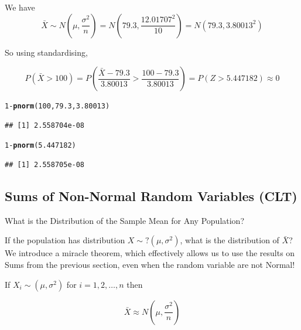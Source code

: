 \documentclass[t,xcolor=pdftex,dvipsnames,table]{beamer}\usepackage[]{graphicx}\usepackage[]{color}
\makeatletter
\newcommand{\hlnum}[1]{\textcolor[rgb]{0.686,0.059,0.569}{#1}}%
\newcommand{\hlopt}[1]{\textcolor[rgb]{0,0,0}{#1}}%
\newcommand{\hlstd}[1]{\textcolor[rgb]{0.345,0.345,0.345}{#1}}%
\newcommand{\hlkwd}[1]{\textcolor[rgb]{0.737,0.353,0.396}{\textbf{#1}}}%
\newenvironment{kframe}{%
 \def\at@end@of@kframe{}%
 \ifinner\ifhmode%
  \def\at@end@of@kframe{\end{minipage}}%
  \begin{minipage}{\columnwidth}%
 \fi\fi%
 \def\FrameCommand##1{\hskip\@totalleftmargin \hskip-\fboxsep
 \colorbox{shadecolor}{##1}\hskip-\fboxsep
     \hskip-\linewidth \hskip-\@totalleftmargin \hskip\columnwidth}%
 \MakeFramed {\advance\hsize-\width
   \@totalleftmargin\z@ \linewidth\hsize
   \@setminipage}}%
 {\par\unskip\endMakeFramed%
 \at@end@of@kframe}
\newenvironment{knitrout}{}{} %
\makeatother
\begin{document}
\begin{frame}[fragile]\frametitle{}

We have 
\[ \bar{X} \sim N(\mu,\frac{\sigma^2}{n}) = N(79.3, \frac{12.01707^2}{10} ) = N(79.3, 3.80013^2) \]

So using standardising,

\[ P(\bar{X} > 100) = P(\frac{\bar{X}-79.3}{3.80013} > \frac{100-79.3}{3.80013}) = P(Z > 5.447182) \approx 0 \]

\begin{knitrout}
\color{fgcolor}\begin{kframe}
\begin{alltt}
\hlnum{1}\hlopt{-}\hlkwd{pnorm}\hlstd{(}\hlnum{100}\hlstd{,}\hlnum{79.3}\hlstd{,}\hlnum{3.80013}\hlstd{)}
\end{alltt}
\begin{verbatim}
## [1] 2.558704e-08
\end{verbatim}
\begin{alltt}
\hlnum{1}\hlopt{-}\hlkwd{pnorm}\hlstd{(}\hlnum{5.447182}\hlstd{)}
\end{alltt}
\begin{verbatim}
## [1] 2.558705e-08
\end{verbatim}
\end{kframe}
\end{knitrout}
\end{frame}






\subsection[SumsNonNormal]{Sums of Non-Normal Random Variables (CLT)}
\begin{frame}{What is the Distribution of the Sample Mean for Any Population?}

If the population has distribution $X \sim ?(\mu, \sigma^2)$, what is the distribution of $\bar{X}$? We introduce a miracle theorem, which effectively allows us to use the results on Sums from the previous  section, even when the random variable are not Normal!

\vspace{.5cm}
\begin{definition}

If $X_{i} \sim  (\mu, \sigma^2)$ for $i=1,2,\ldots,n$ then

\[ \bar{X} \approx N (\mu, \frac{\sigma^2}{n}) \]

\end{definition}
\end{frame}
\end{document}
